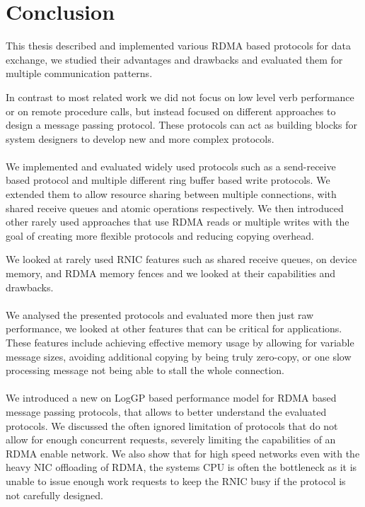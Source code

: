 \section{Conclusion}

This thesis described and implemented various RDMA based protocols for data exchange, we studied their advantages and 
drawbacks and evaluated them for multiple communication patterns.

In contrast to most related work we did not focus on low level verb performance or on remote procedure calls, but instead 
focused on different approaches to design a message passing protocol. These protocols can act as building blocks for 
system designers to develop new and more complex protocols.

\paragraph{} We implemented and evaluated widely used protocols such as a send-receive based protocol and multiple different
ring buffer based write protocols. We extended them to allow resource sharing between multiple connections, with shared 
receive queues and atomic operations respectively. We then introduced other rarely used approaches that use RDMA reads or 
multiple writes with the goal of creating more flexible protocols and reducing copying overhead.

We looked at rarely used RNIC features such as shared receive queues, on device memory, and RDMA memory fences and we looked
at their capabilities and drawbacks.


\paragraph{} We analysed the presented protocols and evaluated more then just raw performance, we looked at other
features that can be critical for applications.  These features include achieving effective memory usage by allowing 
for variable message sizes, avoiding additional copying by being truly zero-copy, or one slow processing message not
being able to stall the whole connection.

\paragraph{} We introduced a new on LogGP based performance model for RDMA based message passing protocols, that allows to 
better understand the evaluated protocols. We discussed the often ignored limitation of protocols that do not allow for enough
concurrent requests, severely limiting the capabilities of an RDMA enable network. We also show that for high speed networks
even with the heavy NIC offloading of RDMA, the systems CPU is often the bottleneck as it is unable to issue enough work requests to
keep the RNIC busy if the protocol is not carefully designed.


